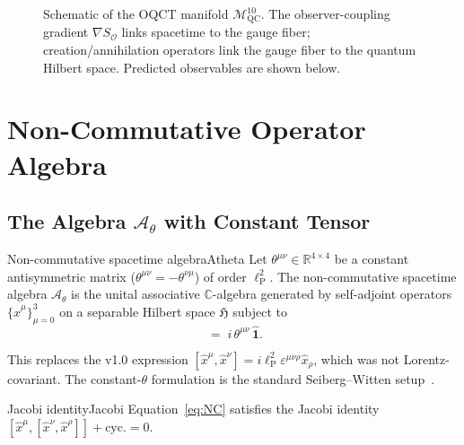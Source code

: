 \documentclass[11pt,a4paper]{article}
\theoremstyle{myrmk}
\newcommand{\Mmanifold}{\mathcal{M}^{10}_{\mathrm{QC}}}
\newcommand{\SO}{\nabla S_{\!\mathcal{O}}}
\newcommand{\lP}{\ell_{\mathrm{P}}}
\newcommand{\Identity}{\hat{\mathbf{1}}}
\begin{document}
\begin{figure}[H]
\caption{Schematic of the OQCT manifold $\Mmanifold$. The observer-coupling
gradient $\SO$ links spacetime to the gauge fiber; creation/annihilation operators
link the gauge fiber to the quantum Hilbert space. Predicted observables are shown
below.}
\label{fig:manifold}
\end{figure}

\section{Non-Commutative Operator Algebra}
\label{sec:nc}

\subsection{The Algebra $\mathcal{A}_\theta$ with Constant Tensor}

\begin{definition}{Non-commutative spacetime algebra}{Atheta}
Let $\theta^{\mu\nu}\in\mathbb{R}^{4\times 4}$ be a constant antisymmetric matrix
($\theta^{\mu\nu}=-\theta^{\nu\mu}$) of order $\lP^2$. The non-commutative spacetime
algebra $\mathcal{A}_\theta$ is the unital associative $\mathbb{C}$-algebra generated
by self-adjoint operators $\{\hat x^\mu\}_{\mu=0}^{3}$ on a separable Hilbert space
$\mathfrak H$ subject to
\begin{equation}
  [\hat x^\mu,\hat x^\nu] \;=\; i\,\theta^{\mu\nu}\,\Identity.
  \label{eq:NC}
\end{equation}
\end{definition}

This replaces the v1.0 expression $[\hat x^\mu,\hat x^\nu]=i\lP^2\varepsilon^{\mu\nu\rho}\hat x_\rho$,
which was not Lorentz-covariant. The constant-$\theta$ formulation is the standard
Seiberg--Witten setup~\cite{SeibergWitten1999,Connes1994}.

\begin{theorem}{Jacobi identity}{Jacobi}
Equation~\eqref{eq:NC} satisfies the Jacobi identity
$[\hat x^\mu,[\hat x^\nu,\hat x^\rho]]+\mathrm{cyc.}=0$.
\end{theorem}
\end{document}
